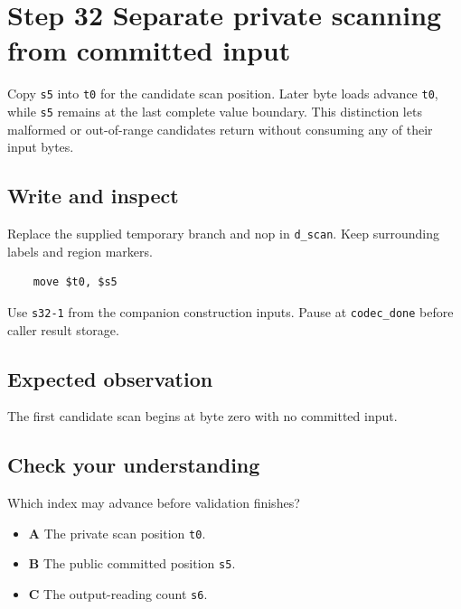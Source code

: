 \section{Step 32 Separate private scanning from committed input}\label{delta-s32}

Copy \texttt{s5} into \texttt{t0} for the candidate scan position. Later byte loads advance \texttt{t0}, while \texttt{s5} remains at the last complete value boundary. This distinction lets malformed or out-of-range candidates return without consuming any of their input bytes.

\subsection{Write and inspect}
Replace the supplied temporary branch and nop in \texttt{d\_scan}. Keep surrounding labels and region markers.

\begin{verbatim}
    move $t0, $s5
\end{verbatim}
Use \texttt{s32-1} from the companion construction inputs. Pause at \texttt{codec\_done} before caller result storage.

\subsection{Expected observation}
The first candidate scan begins at byte zero with no committed input.

\subsection{Check your understanding}
Which index may advance before validation finishes?

\begin{itemize}
\item \textbf{A} The private scan position \texttt{t0}.
\item \textbf{B} The public committed position \texttt{s5}.
\item \textbf{C} The output-reading count \texttt{s6}.
\end{itemize}
